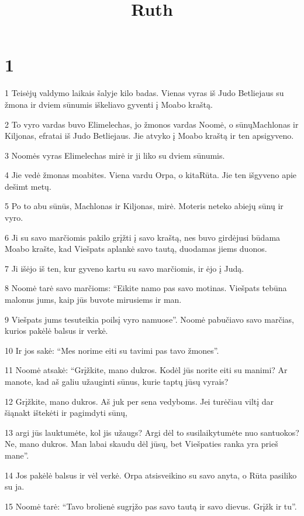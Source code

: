 

\title{Ruth}

\chapter{1}


\par 1 Teisėjų valdymo laikais šalyje kilo badas. Vienas vyras iš Judo Betliejaus su žmona ir dviem sūnumis iškeliavo gyventi į Moabo kraštą. 
\par 2 To vyro vardas buvo Elimelechas, jo žmonos vardas Noomė, o sūnų­Machlonas ir Kiljonas, efratai iš Judo Betliejaus. Jie atvyko į Moabo kraštą ir ten apsigyveno. 
\par 3 Noomės vyras Elimelechas mirė ir ji liko su dviem sūnumis. 
\par 4 Jie vedė žmonas moabites. Viena vardu Orpa, o kita­Rūta. Jie ten išgyveno apie dešimt metų. 
\par 5 Po to abu sūnūs, Machlonas ir Kiljonas, mirė. Moteris neteko abiejų sūnų ir vyro. 
\par 6 Ji su savo marčiomis pakilo grįžti į savo kraštą, nes buvo girdėjusi būdama Moabo krašte, kad Viešpats aplankė savo tautą, duodamas jiems duonos. 
\par 7 Ji išėjo iš ten, kur gyveno kartu su savo marčiomis, ir ėjo į Judą. 
\par 8 Noomė tarė savo marčioms: “Eikite namo pas savo motinas. Viešpats tebūna malonus jums, kaip jūs buvote mirusiems ir man. 
\par 9 Viešpats jums tesuteikia poilsį vyro namuose”. Noomė pabučiavo savo marčias, kurios pakėlė balsus ir verkė. 
\par 10 Ir jos sakė: “Mes norime eiti su tavimi pas tavo žmones”. 
\par 11 Noomė atsakė: “Grįžkite, mano dukros. Kodėl jūs norite eiti su manimi? Ar manote, kad aš galiu užauginti sūnus, kurie taptų jūsų vyrais? 
\par 12 Grįžkite, mano dukros. Aš juk per sena vedyboms. Jei turėčiau viltį dar šiąnakt ištekėti ir pagimdyti sūnų, 
\par 13 argi jūs lauktumėte, kol jis užaugs? Argi dėl to susilaikytumėte nuo santuokos? Ne, mano dukros. Man labai skaudu dėl jūsų, bet Viešpaties ranka yra prieš mane”. 
\par 14 Jos pakėlė balsus ir vėl verkė. Orpa atsisveikino su savo anyta, o Rūta pasiliko su ja. 
\par 15 Noomė tarė: “Tavo brolienė sugrįžo pas savo tautą ir savo dievus. Grįžk ir tu”. 
